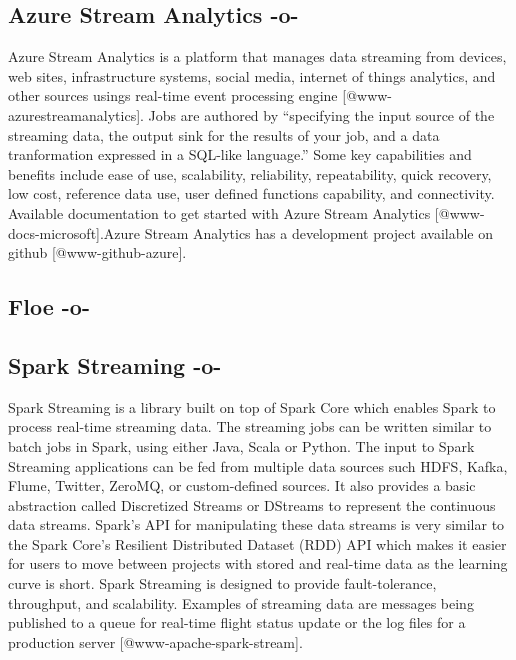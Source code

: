\subsection{Azure Stream Analytics -o-}

Azure Stream Analytics is a platform that manages data streaming from
devices, web sites, infrastructure systems, social media, internet of
things analytics, and other sources usings real-time event processing
engine [@www-azurestreamanalytics]. Jobs are authored by
``specifying the input source of the streaming data, the output sink
for the results of your job, and a data tranformation expressed in a
SQL-like language.''  Some key capabilities and benefits include ease
of use, scalability, reliability, repeatability, quick recovery, low
cost, reference data use, user defined functions capability, and
connectivity. Available documentation to get started with Azure Stream
Analytics [@www-docs-microsoft].Azure Stream Analytics has a
development project available on github [@www-github-azure].



     
\subsection{Floe -o-}



\subsection{Spark Streaming -o-}

Spark Streaming is a library built on top of Spark Core which enables
Spark to process real-time streaming data. The streaming jobs can be
written similar to batch jobs in Spark, using either Java, Scala or
Python. The input to Spark Streaming applications can be fed from
multiple data sources such HDFS, Kafka, Flume, Twitter, ZeroMQ, or
custom-defined sources. It also provides a basic abstraction called
Discretized Streams or DStreams to represent the continuous data
streams. Spark's API for manipulating these data streams is very
similar to the Spark Core's Resilient Distributed Dataset (RDD) API
which makes it easier for users to move between projects with stored
and real-time data as the learning curve is
short\cite{www-apache-spark-RDD}.  Spark Streaming is designed to
provide fault-tolerance, throughput, and scalability. Examples of
streaming data are messages being published to a queue for real-time
flight status update or the log files for a production
server [@www-apache-spark-stream].



